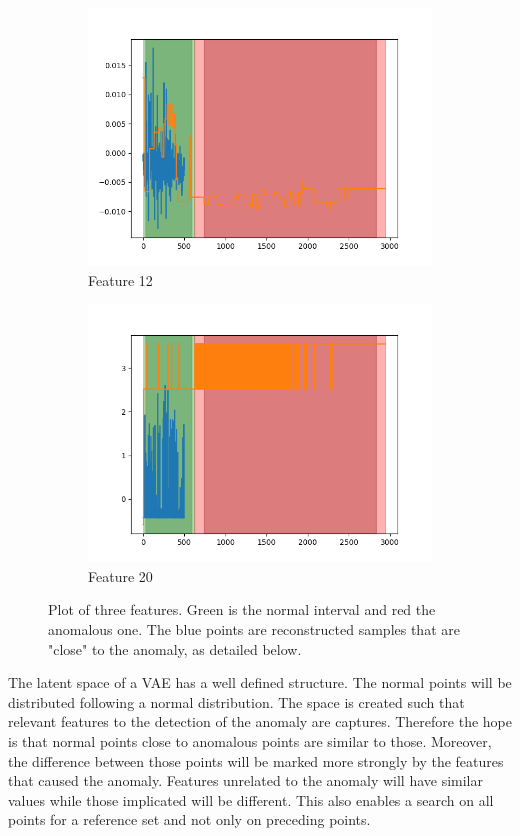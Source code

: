 \documentclass[oneside, a4paper, onecolumn, 11pt]{article}
\begin{document}
\begin{figure}
\begin{subfigure}{0.3\textwidth}
  \includegraphics[width=\linewidth]{images/reconstruction/dim_12.png}
  \caption{Feature 12}
\end{subfigure}
\begin{subfigure}{0.3\textwidth}
  \centering
  \includegraphics[width=\linewidth]{images/reconstruction/dim_20.png}
  \caption{Feature 20}
\end{subfigure}
  \caption{Plot of three features. Green is the normal interval and red the anomalous one. The blue points are reconstructed samples that are "close" to the anomaly, as detailed below.}
  \label{fig:reconstruction}
\end{figure}
The latent space of a VAE has a well defined structure. The normal points will be distributed following a normal distribution. The space is created such that relevant features to the detection of the anomaly are captures. Therefore the hope is that normal points close to anomalous points are similar to those. Moreover, the difference between those points will be marked more strongly by the features that caused the anomaly. Features unrelated to the anomaly will have similar values while those implicated will be different. This also enables a search on all points for a reference set and not only on preceding points.\\
\end{document}
